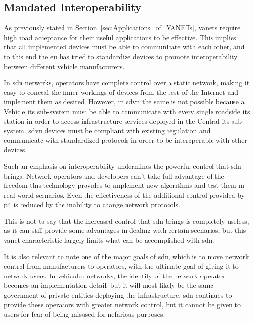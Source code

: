 \subsection{Mandated Interoperability}
\label{subsub:mandated_interoperability}

As previously stated in Section~\ref{sec:Applications_of_VANETs}, \glspl{vanet} require high road acceptance for their useful applications to be effective. This implies that all implemented devices must be able to communicate with each other, and to this end the \gls{eu} has tried to standardize devices to promote interoperability between different vehicle manufacturers.

In \gls{sdn} networks, operators have complete control over a static network, making it easy to conceal the inner workings of devices from the rest of the Internet and implement them as desired. However, in \gls{sdvn} the same is not possible because a Vehicle \gls{its} sub-system must be able to communicate with every single roadside \gls{its} station in order to access infrastructure services deployed in the Central \gls{its} sub-system. \gls{sdvn} devices must be compliant with existing regulation and communicate with standardized protocols in order to be interoperable with other devices.

Such an emphasis on interoperability undermines the powerful control that \gls{sdn} brings. Network operators and developers can't take full advantage of the freedom this technology provides to implement new algorithms and test them in real-world scenarios. Even the effectiveness of the additional control provided by \gls{p4} is reduced by the inability to change network protocols.

This is not to say that the increased control that \gls{sdn} brings is completely useless, as it can still provide some advantages in dealing with certain scenarios, but this \gls{vanet} characteristic largely limits what can be accomplished with \gls{sdn}. 

It is also relevant to note one of the major goals of \gls{sdn}, which is to move network control from manufacturers to operators, with the ultimate goal of giving it to network users. In vehicular networks, the identity of the network operator becomes an implementation detail, but it will most likely be the same government of private entities deploying the infrastructure. \gls{sdn} continues to provide these operators with greater network control, but it cannot be given to users for fear of being misused for nefarious purposes.


